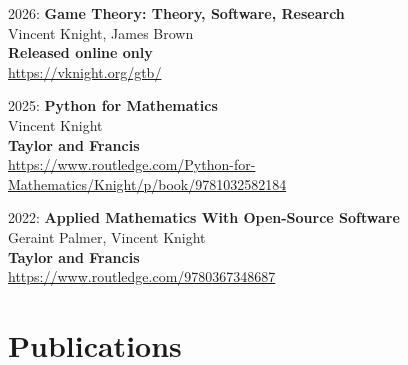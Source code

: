 \documentclass[10pt]{article}
\begin{document}
\begin{etaremune}

\item
  2026: \textbf{Game Theory: Theory, Software, Research}\\
  Vincent Knight, James Brown\\
  \textbf{Released online only}\\
  \url{https://vknight.org/gtb/}\\

\item
  2025: \textbf{Python for Mathematics}\\
  Vincent Knight\\
  \textbf{Taylor and Francis}\\
  \url{https://www.routledge.com/Python-for-Mathematics/Knight/p/book/9781032582184}\\

\item
  2022: \textbf{Applied Mathematics With Open-Source Software}\\
  Geraint Palmer, Vincent Knight\\
  \textbf{Taylor and Francis}\\
  \url{https://www.routledge.com/9780367348687}\\

\end{etaremune}

\section{Publications}
\end{document}
